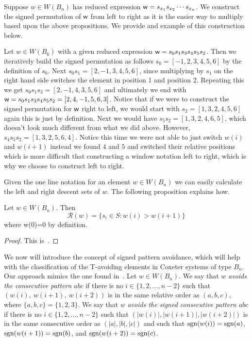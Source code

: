 Suppose $w \in W(B_n)$ has reduced expression $\mathsf{w}=s_{x_1}s_{x_2}\cdots s_{x_n}$. We construct the signed permutation of $\mathsf{w}$ from left to right as it is the easier way to multiply based upon the above propositions. We provide and example of this construction below.

\begin{example}
Let $w \in W(B_6)$ with a given reduced expression $\mathsf{w}=s_0s_1s_3s_4s_5s_2$. Then we iteratively build the signed permutation as follows $s_0=[-1,2,3,4,5,6]$ by the definition of $s_0$. Next $s_0s_1=[2,-1,3,4,5,6]$, since multiplying by $s_1$ on the right hand side switches the element in position 1 and position 2. Repeating this we get $s_0s_1s_3=[2,-1,4,3,5,6]$ and ultimately we end with $\mathsf{w}=s_0s_1s_3s_4s_5s_2=[2,4,-1,5,6,3]$. Notice that if we were to construct the signed permutation for $\mathsf{w}$ right to left, we would start with $s_2=[1,3,2,4,5,6]$ again this is just by definition. Next we would have $s_5s_2=[1,3,2,4,6,5]$, which doesn't look much different from what we did above. However, $s_4s_5s_2=[1,3,2,5,6,4]$. Notice this time we were not able to just switch $w(i)$ and $w(i+1)$ instead we found $4$ and $5$ and switched their relative positions which is more difficult that constructing a window notation left to right, which is why we choose to construct left to right.
\end{example}

Given the one line notation for an element $w \in W(B_n)$ we can easily calculate the left and right descent sets of $w$. The following proposition explains how.

\begin{proposition}\label{prop:descent}
Let $w \in W(B_n)$. Then 
\[ \mathcal{R}(w)=\{s_i \in S: w(i) > w(i+1)\} \]
where w(0)=0 by definition.
\begin{proof}
	This is~\cite[Proposition 8.1.2]{Bjorner2005}.
\end{proof}
\end{proposition}

We now will introduce the concept of signed pattern avoidance, which will help with the classification of the T-avoiding elements in Coxeter systems of type $B_n$. Our approach mimics the one found in~\cite{Gern2013a}. Let $w \in W(B_n)$. We say that $w$ \emph{avoids the consecutive pattern} $abc$ if there is no $i \in \{1,2, \ldots, n-2\}$ such that $(w(i),~w(i+1),~w(i+2))$ is in the same relative order as $(a,b,c),$ where $\{a,b,c\}=\{1,2,3\}$. We say that $w$ \emph{avoids the signed consecutive pattern} $abc$ if there is no $i \in \{1,2, \ldots, n-2\}$ such that $\left(|w(i)|, |w(i+1)|, |w(i+2)|\right)$ is in the same consecutive order as $\left(|a|, |b|, |c| \right)$ and such that $\mathrm{sgn}(w(i))=\mathrm{sgn}(a)$, $\mathrm{sgn}(w(i+1))=\mathrm{sgn}(b)$, and $\mathrm{sgn}(w(i+2))=\mathrm{sgn}(c)$.

